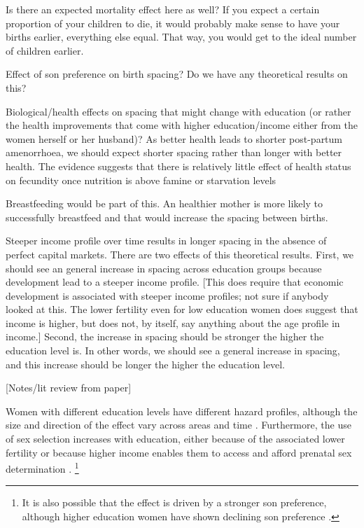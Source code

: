 Is there an expected mortality effect here as well?
If you expect a certain proportion of your children to die, it would probably make sense
to have your births earlier, everything else equal.
That way, you would get to the ideal number of children earlier.

Effect of son preference on birth spacing?
Do we have any theoretical results on this?

Biological/health effects on spacing that might change with education (or rather the
health improvements that come with higher education/income either from the women
herself or her husband)?
As better health leads to shorter post-partum amenorrhoea, we should expect shorter
spacing rather than longer with better health.
The evidence suggests that there is relatively little effect of health status on 
fecundity once nutrition is above famine or starvation levels \citep{Huffman1987,John1987,lindstrom99}


Breastfeeding would be part of this.
An healthier mother is more likely to successfully breastfeed and that would increase the
spacing between births.



Steeper income profile over time results in longer spacing in the absence of perfect
capital markets.
There are two effects of this theoretical results.
First, we should see an general increase in spacing across education groups because
development lead to a steeper income profile.
[This does require that economic development is associated with steeper income profiles;
not sure if anybody looked at this.
The lower fertility even for low education women does suggest that income is higher,
but does not, by itself, say anything about the age profile in income.]
Second, the increase in spacing should be stronger the higher the education level is.
In other words, we should see a general increase in spacing, and this increase should be
longer the higher the education level.






[Notes/lit review from paper]

Women with different education levels have different hazard profiles, although the size 
and direction of the effect vary across areas and time 
\citep{Tulasidhar1993,Whitworth2002,Bhalotra2008,Kim2010,Soest2018}.
Furthermore, the use of sex selection increases with education, either because of the 
associated lower fertility or because higher income enables them to access and
afford prenatal sex determination
\citep{das_gupta97,retherford03b,jha06,Guilmoto2009a,Bongaarts2013,Portner2015b,Jayachandran2017}.%
\footnote{
It is also possible that the effect is driven by a stronger son preference, although 
higher education women have shown declining son preference \citep{bhat03,pande07}.
}


